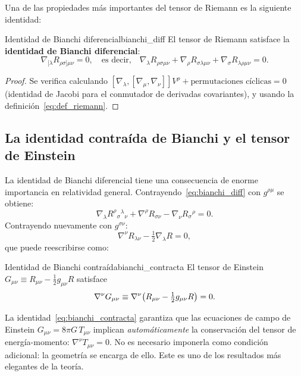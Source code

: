 Una de las propiedades más importantes del tensor de Riemann es la siguiente identidad:

\begin{teorema}{Identidad de Bianchi diferencial}{bianchi_diff}
El tensor de Riemann satisface la \textbf{identidad de Bianchi diferencial}:
\begin{equation}
  \nabla_{[\lambda} R_{\rho\sigma]\mu\nu} = 0,
  \quad\text{es decir,}\quad
  \nabla_\lambda R_{\rho\sigma\mu\nu}
  + \nabla_\rho R_{\sigma\lambda\mu\nu}
  + \nabla_\sigma R_{\lambda\rho\mu\nu} = 0.
  \label{eq:bianchi_diff}
\end{equation}
\end{teorema}

\begin{proof}
Se verifica calculando $[\nabla_\lambda, [\nabla_\mu, \nabla_\nu]]V^\rho + \text{permutaciones cíclicas} = 0$ (identidad de Jacobi para el conmutador de derivadas covariantes), y usando la definición~\eqref{eq:def_riemann}.
\end{proof}

\subsection{La identidad contraída de Bianchi y el tensor de Einstein}

La identidad de Bianchi diferencial tiene una consecuencia de enorme importancia en relatividad general. Contrayendo~\eqref{eq:bianchi_diff} con $g^{\rho\mu}$ se obtiene:
\[
  \nabla_\lambda R^\rho{}_\sigma{}^\lambda{}_\nu + \nabla^\rho R_{\sigma\nu} - \nabla_\nu R_\sigma{}^\rho = 0.
\]
Contrayendo nuevamente con $g^{\sigma\nu}$:
\[
  \nabla^\nu R_{\lambda\nu} - \tfrac{1}{2}\nabla_\lambda R = 0,
\]
que puede reescribirse como:

\begin{corolario}{Identidad de Bianchi contraída}{bianchi_contracta}
El tensor de Einstein $G_{\mu\nu} \equiv R_{\mu\nu} - \tfrac{1}{2}g_{\mu\nu}R$ satisface
\begin{equation}
  \nabla^\nu G_{\mu\nu} \equiv \nabla^\nu\!\left(R_{\mu\nu} - \tfrac{1}{2}g_{\mu\nu}R\right) = 0.
  \label{eq:bianchi_contracta}
\end{equation}
\end{corolario}

\begin{importante}
La identidad~\eqref{eq:bianchi_contracta} garantiza que las ecuaciones de campo de Einstein $G_{\mu\nu} = 8\pi G\, T_{\mu\nu}$ implican \emph{automáticamente} la conservación del tensor de energía-momento: $\nabla^\nu T_{\mu\nu} = 0$. No es necesario imponerla como condición adicional: la geometría se encarga de ello. Este es uno de los resultados más elegantes de la teoría.
\end{importante}

